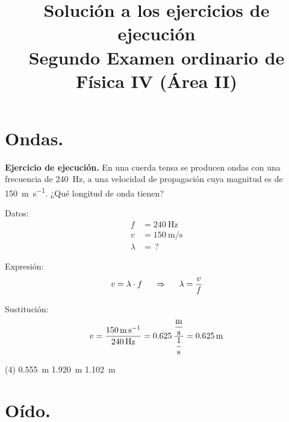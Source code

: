 \documentclass[12pt, letter]{exam}
\date{}
\title{Solución a los ejercicios de ejecución \\ Segundo Examen ordinario de Física IV (Área II)}
\begin{document}
\maketitle

\setcounter{page}{2}

\begin{questions}

    \section{Ondas.}

    \setcounter{question}{3} \question \textbf{Ejercicio de ejecución.} En una cuerda tensa se producen ondas con una frecuencia de \SI{240}{\hertz}, a una velocidad de propagación cuya magnitud es de \SI{150}{\meter\per\second}. ¿Qué longitud de onda tienen?

    \begin{minipage}[t]{0.35\linewidth}
    Datos: 
    \begin{align*}
    f &= \SI{240}{\hertz} \\
    v &= \SI{150}{\meter\per\second} \\
    \lambda &= \, ?
    \end{align*}
    \end{minipage}
    \hspace{1cm}
    \begin{minipage}[t]{0.4\linewidth}
    Expresión:
    \begin{align*}
    v = \lambda \cdot f \hspace{0.5cm} \Rightarrow \hspace{0.5cm} \lambda = \dfrac{v}{f}
    \end{align*}
    \end{minipage}

    Sustitución:
    \begin{align*}
    v = \dfrac{\SI{150}{\meter\per\second}}{\SI{240}{\hertz}} = 0.625 \, \dfrac{ \displaystyle \unit[per-mode=fraction]{\meter\per\second}}{ \displaystyle \unit[per-mode=fraction]{\per\second}} = \SI{0.625}{\meter}
    \end{align*}
    \begin{tasks}(4)
        \task \SI{0.555}{\meter}
        \task {}
        \task \SI{1.920}{\meter}
        \task \SI{1.102}{\meter}
    \end{tasks}

    \setcounter{section}{2}

    \section{Oído.}


\end{questions}
\end{document}
